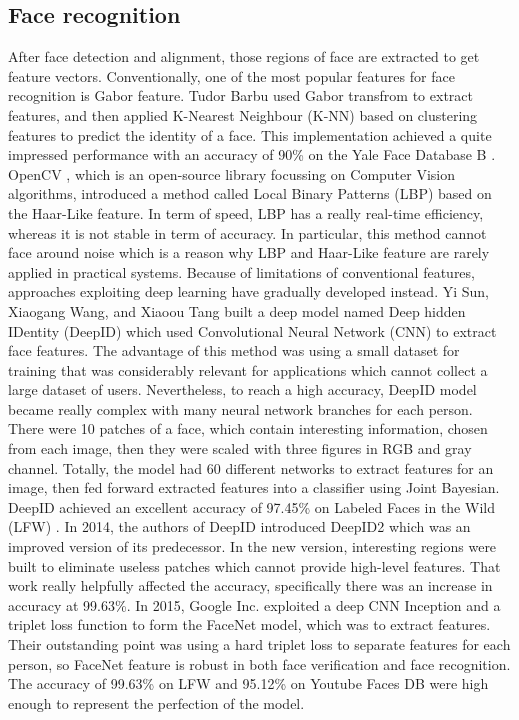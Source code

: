 \documentclass[journal, twocolumn]{IEEEtran}
\begin{document}
\subsection{Face recognition}
After face detection and alignment, those regions of face are extracted to get feature vectors. Conventionally, one of the most popular features for face recognition is Gabor feature. Tudor Barbu \cite{ref:recog-1} used Gabor transfrom to extract features, and then applied K-Nearest Neighbour (K-NN) based on clustering features to predict the identity of a face. This implementation achieved a quite impressed performance with an accuracy of 90\% on the Yale Face Database B \cite{ref:data-yaleB}. OpenCV \cite{ref:recog-2}, which is an open-source library focussing on Computer Vision algorithms, introduced a method called Local Binary Patterns (LBP) based on the Haar-Like feature. In term of speed, LBP has a really real-time efficiency, whereas it is not stable in term of accuracy. In particular, this method cannot face around noise which is a reason why LBP and Haar-Like feature are rarely applied in practical systems. Because of limitations of conventional features, approaches exploiting deep learning have gradually developed instead. Yi Sun, Xiaogang Wang, and Xiaoou Tang \cite{ref:recog-3} built a deep model named Deep hidden IDentity (DeepID) which used Convolutional Neural Network (CNN) to extract face features. The advantage of this method was using a small dataset for training that was considerably relevant for applications which cannot collect a large dataset of users. Nevertheless, to reach a high accuracy, DeepID model became really complex with many neural network branches for each person. There were 10 patches of a face, which contain interesting information, chosen from each image, then they were scaled with three figures in RGB and gray channel. Totally, the model had 60 different networks to extract features for an image, then fed forward extracted features into a classifier using Joint Bayesian. DeepID achieved an excellent accuracy of 97.45\% on Labeled Faces in the Wild (LFW) \cite{ref:data-lfw}. In 2014, the authors of DeepID introduced DeepID2 \cite{ref:recog-4} which was an improved version of its predecessor. In the new version, interesting regions were built to eliminate useless patches which cannot provide high-level features. That work really helpfully affected the accuracy, specifically there was an increase in accuracy at 99.63\%. In 2015, Google Inc. \cite{ref:recog-5} exploited a deep CNN Inception \cite{ref:in-res} and a triplet loss function to form the FaceNet model, which was to extract features. Their outstanding point was using a hard triplet loss to separate features for each person, so FaceNet feature is robust in both face verification and face recognition. The accuracy of 99.63\% on LFW and 95.12\% on Youtube Faces DB \cite{ref:data-youtube} were high enough to represent the perfection of the model.
\end{document}
